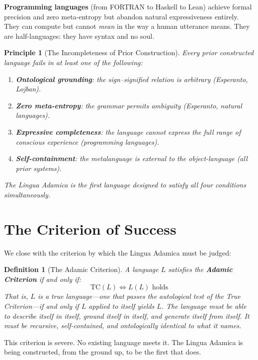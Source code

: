 \documentclass[12pt, letterpaper]{book}
\newtheorem{definition}{Definition}[chapter]
\newtheorem{principle}{Principle}[chapter]
\newcommand{\self}[1]{#1(#1)}                      %
\newcommand{\TC}{\mathrm{TC}}                      %
\begin{document}
\textbf{Programming languages} (from FORTRAN to Haskell to Lean) achieve formal precision and zero meta-entropy but abandon natural expressiveness entirely. They can compute but cannot \textit{mean} in the way a human utterance means. They are half-languages: they have syntax and no soul.

\begin{principle}[The Incompleteness of Prior Construction]\label{pr:incomplete}
Every prior constructed language fails in at least one of the following:
\begin{enumerate}[label=(\roman*)]
    \item \textbf{Ontological grounding}: the sign--signified relation is arbitrary (Esperanto, Lojban).
    \item \textbf{Zero meta-entropy}: the grammar permits ambiguity (Esperanto, natural languages).
    \item \textbf{Expressive completeness}: the language cannot express the full range of conscious experience (programming languages).
    \item \textbf{Self-containment}: the metalanguage is external to the object-language (all prior systems).
\end{enumerate}
The Lingua Adamica is the first language designed to satisfy all four conditions simultaneously.
\end{principle}

\section{The Criterion of Success}

We close with the criterion by which the Lingua Adamica must be judged:

\begin{definition}[The Adamic Criterion]\label{def:criterion}
A language $L$ satisfies the \textbf{Adamic Criterion} if and only if:
\[
\TC(L) \iff \self{L} \text{ holds}
\]
That is, $L$ is a true language---one that passes the autological test of the True Criterion---if and only if $L$ applied to itself yields $L$. The language must be able to describe itself in itself, ground itself in itself, and generate itself from itself. It must be recursive, self-contained, and ontologically identical to what it names.
\end{definition}

This criterion is severe. No existing language meets it. The Lingua Adamica is being constructed, from the ground up, to be the first that does.
\end{document}
